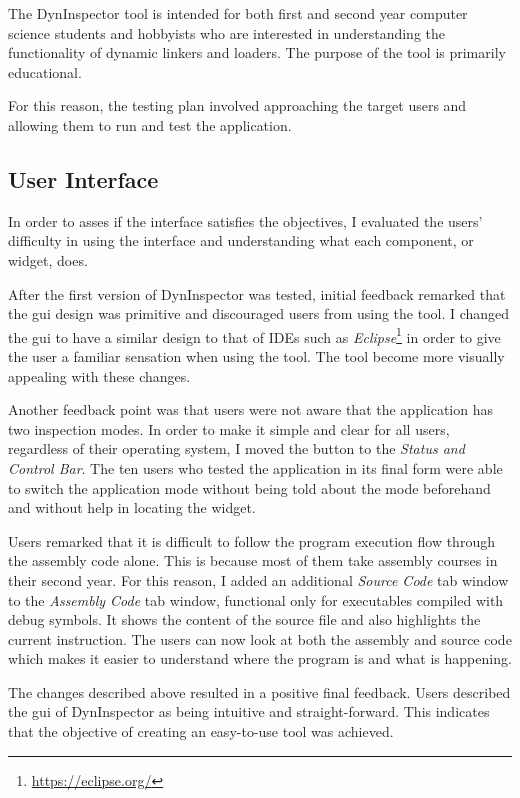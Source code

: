 The DynInspector tool is intended for both first and second year computer science students and hobbyists who are interested in understanding the functionality of dynamic linkers and loaders. The purpose of the tool is primarily educational.

For this reason, the testing plan involved approaching the target users and allowing them to run and test the application.

\subsection{User Interface}

In order to asses if the interface satisfies the objectives, I evaluated the users' difficulty in using the interface and understanding what each component, or widget, does.

After the first version of DynInspector was tested, initial feedback remarked that the gui design was primitive and discouraged users from using the tool. I changed the gui to have a similar design to that of IDEs such as \textit{Eclipse}\footnote{\url{https://eclipse.org/}} in order to give the user a familiar sensation when using the tool. The tool become more visually appealing with these changes.

Another feedback point was that users were not aware that the application has two inspection modes. In order to make it simple and clear for all users, regardless of their operating system, I moved the button to the \textit{Status and Control Bar}. The ten users who tested the application in its final form were able to switch the application mode without being told about the mode beforehand and without help in locating the widget.

Users remarked that it is difficult to follow the program execution flow through the assembly code alone. This is because most of them take assembly courses in their second year. For this reason, I added an additional \textit{Source Code} tab window to the \textit{Assembly Code} tab window, functional only for executables compiled with debug symbols. It shows the content of the source file and also highlights the current instruction. The users can now look at both the assembly and source code which makes it easier to understand where the program is and what is happening.

The changes described above resulted in a positive final feedback. Users described the gui of DynInspector as being intuitive and straight-forward. This indicates that the objective of creating an easy-to-use tool was achieved.

